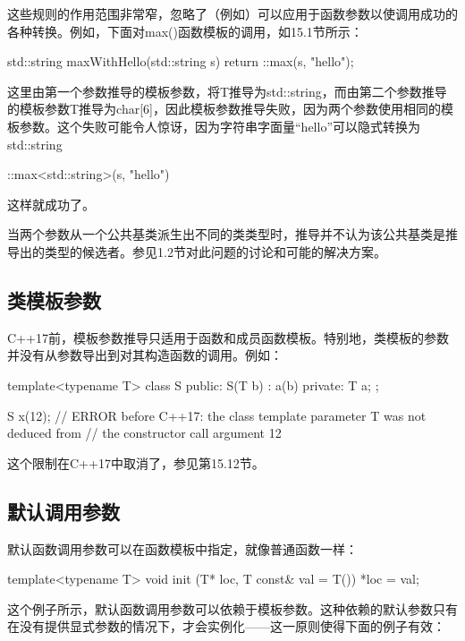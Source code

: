 这些规则的作用范围非常窄，忽略了（例如）可以应用于函数参数以使调用成功的各种转换。例如，下面对max()函数模板的调用，如15.1节所示：

\begin{cpp}
std::string maxWithHello(std::string s)
{
	return ::max(s, "hello");
}
\end{cpp}

这里由第一个参数推导的模板参数，将T推导为std::string，而由第二个参数推导的模板参数T推导为char[6]，因此模板参数推导失败，因为两个参数使用相同的模板参数。这个失败可能令人惊讶，因为字符串字面量“hello”可以隐式转换为std::string

\begin{cpp}
::max<std::string>(s, "hello")
\end{cpp}

这样就成功了。

当两个参数从一个公共基类派生出不同的类类型时，推导并不认为该公共基类是推导出的类型的候选者。参见1.2节对此问题的讨论和可能的解决方案。

\subsection{类模板参数}

C++17前，模板参数推导只适用于函数和成员函数模板。特别地，类模板的参数并没有从参数导出到对其构造函数的调用。例如：

\begin{cpp}
template<typename T>
class S {
	public:
	S(T b) : a(b) {
	}
	private:
	T a;
};

S x(12); // ERROR before C++17: the class template parameter T was not deduced from
// the constructor call argument 12
\end{cpp}

这个限制在C++17中取消了，参见第15.12节。

\subsection{默认调用参数}

默认函数调用参数可以在函数模板中指定，就像普通函数一样：

\begin{cpp}
template<typename T>
void init (T* loc, T const& val = T())
{
	*loc = val;
}
\end{cpp}

这个例子所示，默认函数调用参数可以依赖于模板参数。这种依赖的默认参数只有在没有提供显式参数的情况下，才会实例化——这一原则使得下面的例子有效：

